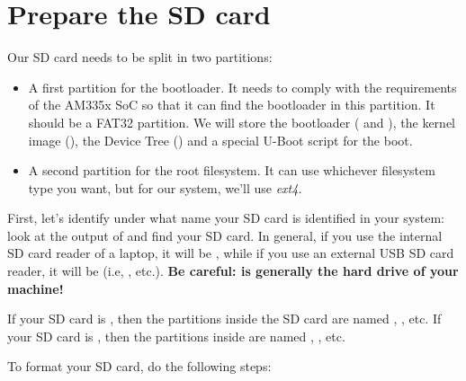 \section{Prepare the SD card}

Our SD card needs to be split in two partitions:

\begin{itemize}

\item A first partition for the bootloader. It needs to comply with
  the requirements of the AM335x SoC so that it can find the bootloader in
  this partition. It should be a FAT32 partition. We will store the
  bootloader ( and ), the kernel image
  (), the Device Tree () and a
  special U-Boot script for the boot.

\item A second partition for the root filesystem. It can use
  whichever filesystem type you want, but for our system, we'll use
  {\em ext4}.

\end{itemize}

First, let's identify under what name your SD card is identified in
your system: look at the output of  and
find your SD card. In general, if you use the internal SD card reader
of a laptop, it will be , while if you use an external
USB SD card reader, it will be  (i.e, ,
etc.). {\bf Be careful:  is generally the hard drive of
  your machine!}

If your SD card is , then the partitions inside the
SD card are named , , etc. If your SD
card is , then the partitions inside are named
, , etc.

To format your SD card, do the following steps:

